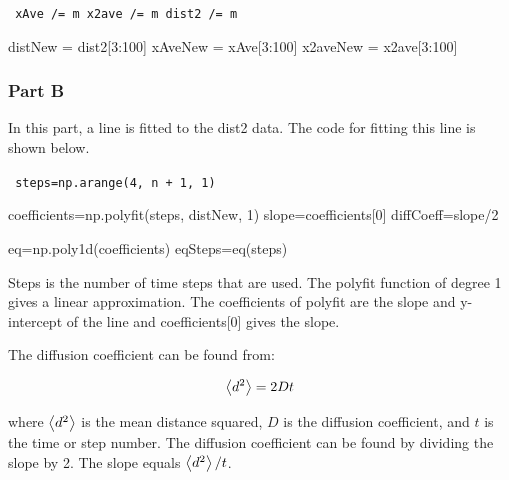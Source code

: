 \documentclass[notitlepage,aps,prd,nofootinbib]{revtex4-1}
\begin{document}
{\tt 
\noindent xAve /= m                   \newline
\noindent x2ave /= m                  \newline
\noindent dist2 /= m                  \newline

\noindent distNew = dist2[3:100]      \newline                    
\noindent xAveNew = xAve[3:100]       \newline                     
\noindent x2aveNew = x2ave[3:100]                   
}

\subsubsection{Part B}

\noindent In this part, a line is fitted to the dist2 data. The code for fitting this line is shown below. \newline

{\tt 
	\noindent steps=np.arange(4, n + 1, 1)                   \newline    
	
	\noindent coefficients=np.polyfit(steps, distNew, 1)     \newline 
	\noindent slope=coefficients[0]                          \newline          
	\noindent diffCoeff=slope/2                              \newline         
	
	\noindent eq=np.poly1d(coefficients)                     \newline               
	\noindent eqSteps=eq(steps)   }                          \newline


\noindent Steps is the number of time steps that are used. The polyfit function of degree 1 gives a linear approximation. The coefficients of polyfit are the slope and y-intercept of the line and coefficients[0] gives the slope. \newline

\noindent The diffusion coefficient can be found from:

\begin{equation}
\expval{d^{2}}=2Dt
\end{equation}

\noindent where $\expval{d^{2}}$ is the mean distance squared, $D$ is the diffusion coefficient, and $t$ is the time or step number. The diffusion coefficient can be found by dividing the slope by 2. The slope equals $\expval{d^{2}}/t$.\newline
\end{document}
